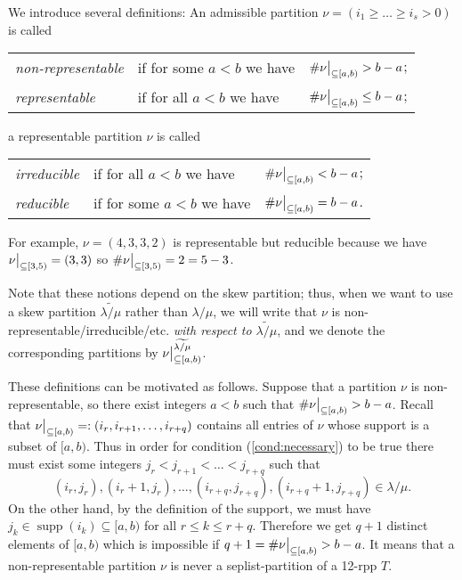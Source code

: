 \documentclass[numbers=enddot,12pt,final,onecolumn,notitlepage]{scrartcl}%
\theoremstyle{definition}
\def\seplistvar{{{\nu}}} %
\def\supp{{\operatorname*{supp}}}
\def\lm{{\lambda/\mu}}
\begin{document}
We introduce several definitions: An admissible partition $\seplistvar=(i_1\geq \dots\geq i_s>0)$ is called

\begin{tabular}{@{$\bullet$ }lll}
 \textit{non-representable} & if for some $a<b$ we have & $\#\nuab>b-a$;\\
 \textit{representable}& if for all $a<b$ we have& $\#\nuab\leq b-a$;\\
\end{tabular}

a representable partition $\seplistvar$ is called

\begin{tabular}{@{$\bullet$ }lll} 
 \textit{irreducible}& if for all  $a<b$ we have &$\#\nuab < b-a$;\\
 \textit{reducible} &if for some $a<b$ we have &$\#\nuab=b-a$.
\end{tabular}

For example, $\seplistvar=(4,3,3,2)$ is representable but reducible because we have $\nuxy{3}{5}=(3,3)$ so $\#\nuxy{3}{5}=2=5-3$.

Note that these notions depend on the skew partition; thus, when we want to use a skew partition $\widetilde\lm$ rather than $\lm$, we will write that $\seplistvar$ is non-representable/irreducible/etc. \textit{with respect to $\widetilde\lm$}, and we denote the corresponding partitions by $\nuab^{\widetilde{\lm}}$.

These definitions can be motivated as follows. Suppose that a partition $\seplistvar$ is non-representable, so there exist integers $a<b$ such that $\#\nuab>b-a$. Recall that $\nuab=:(i_r,i_{r+1},\dots,i_{r+q})$ contains all entries of $\seplistvar$ whose support is a subset of $[a,b)$. Thus in order for condition (\ref{cond:necessary}) to be true there must exist some integers $j_r<j_{r+1}<\dots<j_{r+q}$ such that 
$$(i_r, j_r),(i_r+1, j_r),\dots,(i_{r+q},j_{r+q}),(i_{r+q}+1,j_{r+q})\in\lm.$$
On the other hand, by the definition of the support, we must have $j_k\in \supp(i_k)\subseteq [a,b)$ for all $r\leq k\leq r+q$. Therefore we get $q+1$ distinct elements of $[a,b)$ which is impossible if $q+1=\#\nuab>b-a$. It means that a non-representable partition $\seplistvar$ is never a seplist-partition of a 12-rpp $T$. 
\end{document}
